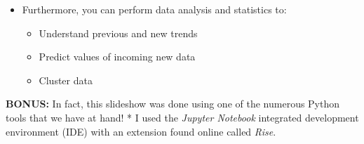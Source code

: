 \documentclass[11pt]{article}
\providecommand{\tightlist}{%
      \setlength{\itemsep}{0pt}\setlength{\parskip}{0pt}}
\begin{document}
    \begin{itemize}
\tightlist
\item
  Furthermore, you can perform data analysis and statistics to:

  \begin{itemize}
  \tightlist
  \item
    Understand previous and new trends
  \item
    Predict values of incoming new data
  \item
    Cluster data
  \end{itemize}
\end{itemize}

    \textbf{BONUS:} In fact, this slideshow was done using one of the
numerous Python tools that we have at hand! * I used the \emph{Jupyter
Notebook} integrated development environment (IDE) with an extension
found online called \emph{Rise}.


    
    
    
    
\end{document}

